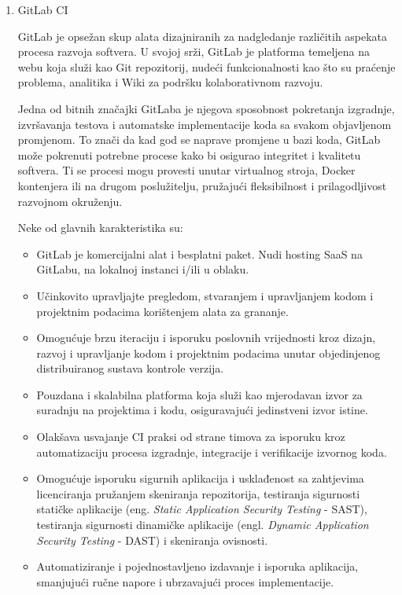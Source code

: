 \documentclass[a4paper,12pt,oneside]{article}
\begin{document}
\begin{enumerate}

\item 
GitLab CI 

GitLab \cite{gitlab} je opsežan skup alata dizajniranih za nadgledanje različitih aspekata procesa razvoja softvera. U svojoj srži, GitLab je platforma temeljena na webu koja služi kao Git repozitorij, nudeći funkcionalnosti kao što su praćenje problema, analitika i Wiki za podršku kolaborativnom razvoju.

Jedna od bitnih značajki GitLaba je njegova sposobnost pokretanja izgradnje, izvršavanja testova i automatske implementacije koda sa svakom objavljenom promjenom. To znači da kad god se naprave promjene u bazi koda, GitLab može pokrenuti potrebne procese kako bi osigurao integritet i kvalitetu softvera. Ti se procesi mogu provesti unutar virtualnog stroja, Docker kontenjera ili na drugom poslužitelju, pružajući fleksibilnost i prilagodljivost razvojnom okruženju.

Neke od glavnih karakteristika su:
\begin{itemize}
\item GitLab je komercijalni alat i besplatni paket. Nudi hosting SaaS na GitLabu, na lokalnoj instanci i/ili u oblaku.
\item Učinkovito upravljajte pregledom, stvaranjem i upravljanjem kodom i projektnim podacima korištenjem alata za grananje.
\item Omogućuje brzu iteraciju i isporuku poslovnih vrijednosti kroz dizajn, razvoj i upravljanje kodom i projektnim podacima unutar objedinjenog distribuiranog sustava kontrole verzija.
\item Pouzdana i skalabilna platforma koja služi kao mjerodavan izvor za suradnju na projektima i kodu, osiguravajući jedinstveni izvor istine.
\item Olakšava usvajanje CI praksi od strane timova za isporuku kroz automatizaciju procesa izgradnje, integracije i verifikacije izvornog koda.
\item Omogućuje isporuku sigurnih aplikacija i usklađenost sa zahtjevima licenciranja pružanjem skeniranja repozitorija, testiranja sigurnosti statičke aplikacije (eng. \textit{Static Application Security Testing} - SAST), testiranja sigurnosti dinamičke aplikacije (engl. \textit{Dynamic Application Security Testing} - DAST) i skeniranja ovisnosti.
\item Automatiziranje i pojednostavljeno izdavanje i isporuka aplikacija, smanjujući ručne napore i ubrzavajući proces implementacije.
\end{itemize}


\end{enumerate}
\end{document}
